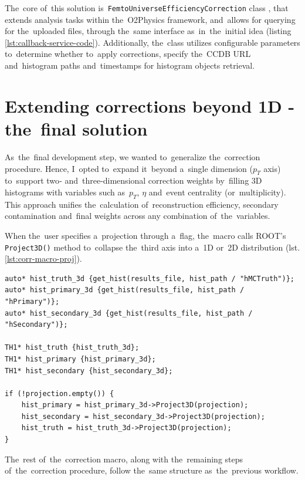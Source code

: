 \documentclass[11pt,a4paper,twoside]{book}
\numberwithin{equation}{chapter}
\begin{document}
The core of this solution is \verb|FemtoUniverseEfficiencyCorrection| class \cite{efficiency-correction-class}, that extends analysis tasks within the O2Physics framework, and allows for querying for the uploaded files, through the same interface as in the initial idea (listing \ref{lst:callback-service-code}). Additionally, the class utilizes configurable parameters to determine whether to apply corrections, specify the CCDB URL and histogram paths and timestamps for histogram objects retrieval.

\section{Extending corrections beyond 1D - the final solution}

As the final development step, we wanted to generalize the correction procedure. Hence, I opted to expand it beyond a single dimension ($p_{T}$ axis) to support two‐ and three‐dimensional correction weights by filling 3D histograms with variables such as $p_{T}$, $\eta$ and event centrality (or multiplicity). This approach unifies the calculation of reconstruction efficiency, secondary contamination and final weights across any combination of the variables.

When the user specifies a projection through a flag, the macro calls ROOT's \verb|Project3D()| method to collapse the third axis into a 1D or 2D distribution (lst. \ref{lst:corr-macro-proj}).

\begin{lstlisting}[caption={\label{lst:corr-macro-proj} Snippet of the correction macro - projection.}]
auto* hist_truth_3d {get_hist(results_file, hist_path / "hMCTruth")};
auto* hist_primary_3d {get_hist(results_file, hist_path / "hPrimary")};
auto* hist_secondary_3d {get_hist(results_file, hist_path / "hSecondary")};

TH1* hist_truth {hist_truth_3d};
TH1* hist_primary {hist_primary_3d};
TH1* hist_secondary {hist_secondary_3d};

if (!projection.empty()) {
    hist_primary = hist_primary_3d->Project3D(projection);
    hist_secondary = hist_secondary_3d->Project3D(projection);
    hist_truth = hist_truth_3d->Project3D(projection);
}
\end{lstlisting}

The rest of the correction macro, along with the remaining steps of the correction procedure, follow the same structure as the previous workflow.

\end{document}
